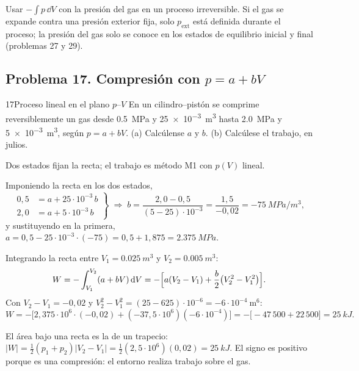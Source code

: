 \begin{observacion}
Usar $-\int p\,\dd V$ con la presión del gas en un proceso irreversible. Si el gas se expande contra una
presión exterior fija, solo $p_{\mathrm{ext}}$ está definida durante el proceso; la presión del gas solo se
conoce en los estados de equilibrio inicial y final (problemas 27 y 29).
\end{observacion}

\subsection{Problema 17. Compresión con \texorpdfstring{$p=a+bV$}{p = a + bV}}
\begin{problema}{17}{Proceso lineal en el plano $p$--$V$}
En un cilindro--pistón se comprime reversiblemente un gas desde \SI{0,5}{MPa} y \SI{25e-3}{m^3} hasta
\SI{2,0}{MPa} y \SI{5e-3}{m^3}, según $p=a+bV$. (a) Calcúlense $a$ y $b$. (b) Calcúlese el trabajo, en julios.
\end{problema}

\begin{resolucion}
\idea Dos estados fijan la recta; el trabajo es método M1 con $p(V)$ lineal.

 Imponiendo la recta en los dos estados,
\[
  \left.\begin{aligned}0{,}5&=a+25\cdot10^{-3}\,b\\ 2{,}0&=a+5\cdot10^{-3}\,b\end{aligned}\right\}
  \;\Longrightarrow\;
  b=\frac{2{,}0-0{,}5}{(5-25)\cdot10^{-3}}=\frac{1{,}5}{-0{,}02}=\boxed{-\SI{75}{MPa/m^3}},
\]
y sustituyendo en la primera, $a=0{,}5-25\cdot10^{-3}\cdot(-75)=0{,}5+1{,}875=\boxed{\SI{2,375}{MPa}}$.

 Integrando la recta entre $V_1=\SI{0,025}{m^3}$ y $V_2=\SI{0,005}{m^3}$:
\[
  W=-\int_{V_1}^{V_2}(a+bV)\,\mathrm{d} V=-\Bigl[a(V_2-V_1)+\frac b2\bigl(V_2^2-V_1^2\bigr)\Bigr].
\]
Con $V_2-V_1=-0{,}02$ y $V_2^2-V_1^2=(25-625)\cdot10^{-6}=-6\cdot10^{-4}\ \mathrm{m^6}$:
\[
  W=-\bigl[2{,}375\cdot10^{6}\cdot(-0{,}02)+(-37{,}5\cdot10^{6})(-6\cdot10^{-4})\bigr]
   =-\bigl[-47\,500+22\,500\bigr]=\boxed{\SI{25}{kJ}}.
\]

 El área bajo una recta es la de un trapecio:
$|W|=\tfrac12(p_1+p_2)|V_2-V_1|=\tfrac12(2{,}5\cdot10^{6})(0{,}02)=\SI{25}{kJ}$. El signo es positivo porque
es una compresión: el entorno realiza trabajo sobre el gas.
\end{resolucion}

